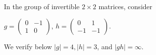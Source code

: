 \begin{xca}
In the group of invertible $2 \times 2$ matrices, consider
\begin{center}
    $g =
    \left( \begin{array}{cc}
        0 & -1 \\
        1 & 0 \end{array} \right)$,
    $h =
    \left( \begin{array}{cc}
        0  & 1 \\
        -1 & -1 \end{array} \right)$.
\end{center}
We verify below $|g| = 4, |h| = 3$, and $|gh| = \infty$.
\end{xca}
